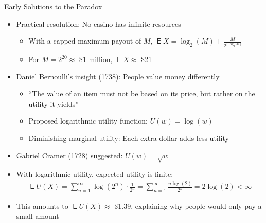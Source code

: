 \documentclass[10pt]{beamer}
\DeclareMathOperator\expc{\mathsf{E}}
\begin{document}
\begin{frame}{Early Solutions to the Paradox}
  \begin{itemize}[<+->]
    \item Practical resolution: No casino has infinite resources
      \begin{itemize}
        \item With a capped maximum payout of $M$, $\expc{X} = \log_2(M) + \frac{M}{2^{\lfloor \log_2 M \rfloor}}$
        \item For $M = 2^{20} \approx$ \$1 million, $\expc{X} \approx$ \$21
      \end{itemize}
    \item Daniel Bernoulli's insight (1738): People value money differently
      \begin{itemize}
        \item ``The value of an item must not be based on its price, but rather on the utility it yields''
        \item Proposed logarithmic utility function: $U(w) = \log(w)$
        \item Diminishing marginal utility: Each extra dollar adds less utility
      \end{itemize}
    \item Gabriel Cramer (1728) suggested: $U(w) = \sqrt{w}$ 
    \item With logarithmic utility, expected utility is finite:
      \begin{align*}
        \expc{U(X)} = \sum_{n=1}^{\infty} \log(2^n) \cdot \frac{1}{2^n} = \sum_{n=1}^{\infty} \frac{n \log(2)}{2^n} = 2\log(2) < \infty
      \end{align*}
    \item This amounts to $\expc{U(X)} \approx$ \$1.39, explaining why people would only pay a small amount
  \end{itemize}
\end{frame}
\end{document}
